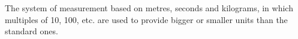 The system of measurement based on metres, seconds
and kilograms, in which multiples of 10, 100, etc. are used to provide bigger or smaller units than 
the standard ones.